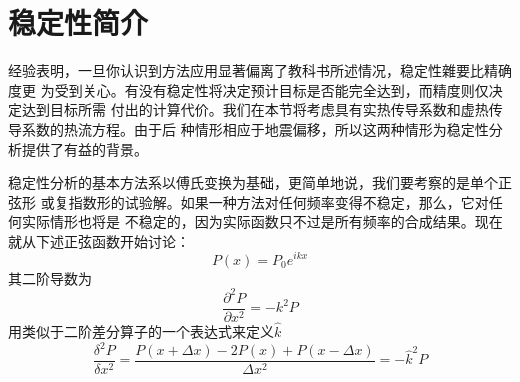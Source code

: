 \section{稳定性简介}
\label{sec:2.8}

经验表明，一旦你认识到方法应用显著偏离了教科书所述情况，稳定性雜要比精确度更
为受到关心。有没有稳定性将决定预计目标是否能完全达到，而精度则仅决定达到目标所需
付出的计算代价。我们在本节将考虑具有实热传导系数和虚热传导系数的热流方程。由于后
种情形相应于地震偏移，所以这两种情形为稳定性分析提供了有益的背景。

稳定性分析的基本方法系以傅氏变换为基础，更简单地说，我们要考察的是单个正弦形
或复指数形的试验解。如果一种方法对任何频率变得不稳定，那么，它对任何实际情形也将是
不稳定的，因为实际函数只不过是所有频率的合成结果。现在就从下述正弦函数开始讨论：
\begin{equation}
P(x)=P_0e^{ikx}
\label{eq:ex2.8.1}
\end{equation}
其二阶导数为
\begin{equation}
\frac{\partial^2 P }{\partial x^2} =-k^2P
\label{eq:ex2.8.2}
\end{equation}
用类似于二阶差分算子的一个表达式来定义$\hat{k}$
\begin{subequations}
  \begin{equation}
  \frac{\delta^2 P }{\delta x^2}=\frac{P(x+\Delta x)-2P(x)+P(x-\Delta x)}{\Delta x^2}
  \label{eq:ex2.8.3a}
  \end{equation}
  \begin{equation}
  =-\hat{k}^2P
  \label{eq:ex2.8.3b}
  \end{equation}
\label{eq:ex2.8.3}
\end{subequations}
